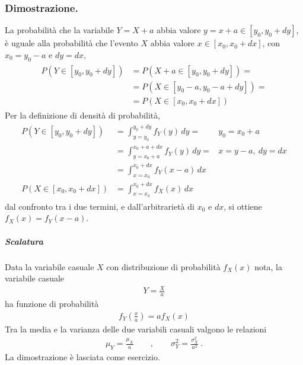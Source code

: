 \documentclass[letterpaper,10pt,italian]{jupyterBook}
\begin{document}
\subsubsection*{Dimostrazione.}

\sphinxAtStartPar
La probabilità che la variabile \(Y = X + a\) abbia valore \(y = x + a \in [ y_0, y_0 + dy ]\), è uguale alla probabilità che l’evento \(X\) abbia valore \(x \in [x_0, x_0 + dx]\), con \(x_0 = y_0 - a\) e \(dy = dx\),
\begin{equation*}
\begin{split}\begin{aligned}
  P(Y \in [y_0, y_0 + dy]) & = P(X + a \in [y_0, y_0 + dy]) = \\
  & = P(X \in [y_0 - a, y_0 - a + dy]) = \\
  & = P(X \in [x_0, x_0 + dx])
\end{aligned}\end{split}
\end{equation*}
\sphinxAtStartPar
Per la definizione di densità di probabilità,
\begin{equation*}
\begin{split}\begin{aligned}
  P(Y \in [y_0, y_0 + dy]) & = \int_{y=y_0}^{y_0 + dy} f_Y(y) \, dy =  & y_0 = x_0 + a \\
  & = \int_{y=x_0+a}^{x_0 + a + dx} f_Y(y) \, dy = & x = y - a, \ dy = dx \\
  & = \int_{x=x_0}^{x_0+dx} f_Y(x-a) \, dx \\
  P(X \in [x_0, x_0 + dx]) & = \int_{x=x_0}^{x_0+dx} f_X(x) \, dx
\end{aligned}\end{split}
\end{equation*}
\sphinxAtStartPar
dal confronto tra i due termini, e dall’arbitrarietà di \(x_0\) e \(dx\), si ottiene \(f_{X}(x) = f_Y(x-a)\).


\subparagraph{Scalatura}
\label{\detokenize{ch/statistics/rv_pdf_transformations:scalatura}}
\sphinxAtStartPar
Data la variabile casuale \(X\) con distribuzione di probabilità \(f_X(x)\) nota, la variabile casuale
\begin{equation*}
\begin{split}Y = \frac{X}{a}\end{split}
\end{equation*}
\sphinxAtStartPar
ha funzione di probabilità
\begin{equation*}
\begin{split}f_Y\left( \frac{x}{a} \right) = a f_X(x)\end{split}
\end{equation*}
\sphinxAtStartPar
Tra la media e la varianza delle due variabili casuali valgono le relazioni
\begin{equation*}
\begin{split}\mu_Y = \frac{\mu_X}{a} \qquad , \qquad \sigma^2_Y = \frac{\sigma^2_X}{a^2} \ .\end{split}
\end{equation*}
\sphinxAtStartPar
La dimostrazione è lasciata come esercizio.
\end{document}
